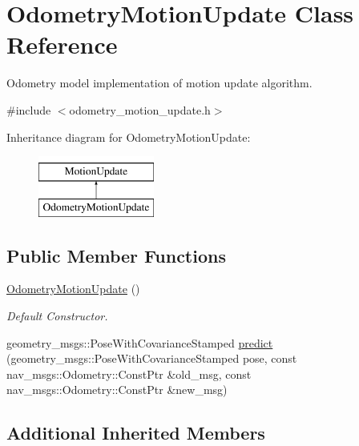 \hypertarget{classOdometryMotionUpdate}{\section{Odometry\-Motion\-Update Class Reference}
\label{classOdometryMotionUpdate}
}


Odometry model implementation of motion update algorithm.  




{\ttfamily \#include $<$odometry\-\_\-motion\-\_\-update.\-h$>$}

Inheritance diagram for Odometry\-Motion\-Update\-:\begin{figure}[H]
\begin{center}
\leavevmode
\includegraphics[height=2.000000cm]{classOdometryMotionUpdate}
\end{center}
\end{figure}
\subsection*{Public Member Functions}
\begin{DoxyCompactItemize}
\item 
\hypertarget{classOdometryMotionUpdate_aad5ced92f80ce30e6685837f8a593295}{\hyperlink{classOdometryMotionUpdate_aad5ced92f80ce30e6685837f8a593295}{Odometry\-Motion\-Update} ()}\label{classOdometryMotionUpdate_aad5ced92f80ce30e6685837f8a593295}

\begin{DoxyCompactList}\small\item\em Default Constructor. \end{DoxyCompactList}\item 
geometry\-\_\-msgs\-::\-Pose\-With\-Covariance\-Stamped \hyperlink{classOdometryMotionUpdate_aae9430006166324a62f4f7fbbd510841}{predict} (geometry\-\_\-msgs\-::\-Pose\-With\-Covariance\-Stamped pose, const nav\-\_\-msgs\-::\-Odometry\-::\-Const\-Ptr \&old\-\_\-msg, const nav\-\_\-msgs\-::\-Odometry\-::\-Const\-Ptr \&new\-\_\-msg)
\end{DoxyCompactItemize}
\subsection*{Additional Inherited Members}


